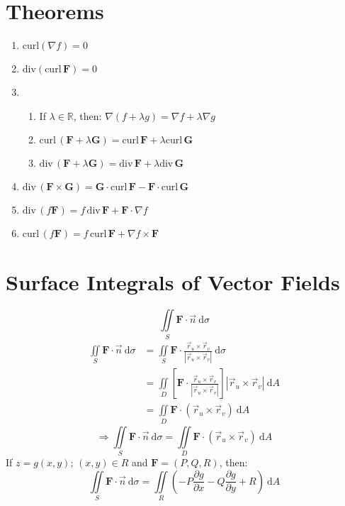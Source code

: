\documentclass[12pt, fleqn]{book}
\newcommand{\D}{\mathrm{d}}
\newcommand{\iis}{\iint\limits_S}
\newcommand{\rutrv}{\vec{r}_u \times \vec{r}_v\right}
\newcommand{\F}{\mathbf{F}}
\newcommand{\G}{\mathbf{G}}
\newcommand{\Curl}{\mathrm{curl}}
\newcommand{\Div}{\mathrm{div}}
\newcommand{\xy}{(x, y)}
\newcommand{\rond}[2]{\frac{\partial #1}{\partial #2}}
\begin{document}
	\section{Theorems}
		\begin{enumerate}
			\item $\Curl(\nabla f) = 0$
			\item $\Div(\Curl \, \F) = 0$
			\item \begin{enumerate}
				\item If $\lambda \in \mathbb{R}$, then: $\nabla(f + \lambda g) = \nabla f + \lambda \nabla g$
				\item $\Curl \, (\F + \lambda \G) = \Curl \, \F + \lambda\Curl \, \G$
				\item $\Div \, (\F + \lambda \G) = \Div \, \F + \lambda\Div \, \G$
			\end{enumerate}
			\item $\Div \, (\F \times \G) = \G \cdot \Curl \, \F - \F \cdot \Curl \, \G$
			\item $\Div \, (f \F) = f \, \Div \, \F + \F \cdot \nabla f$
			\item $\Curl \, (f \F) = f \, \Curl \, \F + \nabla f \times \F$
		\end{enumerate}
	\section{Surface Integrals of Vector Fields}
		\begin{equation}
			\iis \F \cdot \vec{n} \ \D \sigma
		\end{equation}
		\begin{equation*}
			\begin{split}
				\iis \F \cdot \vec{n} \ \D \sigma
				&  = \iis \F \cdot \frac{\vec{r}_u \times \vec{r}_v}{\left|\rutrv|} \ \D \sigma \\
				& = \iint\limits_D \left[\F \cdot \frac{\vec{r}_u \times \vec{r}_v}{\left|\rutrv|}\right] \left|\rutrv| \ \D A \\
				& = \iint\limits_D \F \cdot \left(\rutrv) \ \D A
			\end{split}
		\end{equation*}
		\begin{equation}
			\Rightarrow 
			\iis \F \cdot \vec{n} \ \D \sigma = \iint\limits_D \F \cdot \left(\rutrv) \ \D A
		\end{equation}
		If $z = g\xy; \, \xy \in R$ and $\F = (P, Q, R)$, then:
		\begin{equation}
			\iis \F \cdot \vec{n} \ \D \sigma = 
			\iint\limits_R \left(-P \rond{g}{x} - Q\rond{g}{y} + R\right) \ \D A
		\end{equation}
\end{document}

